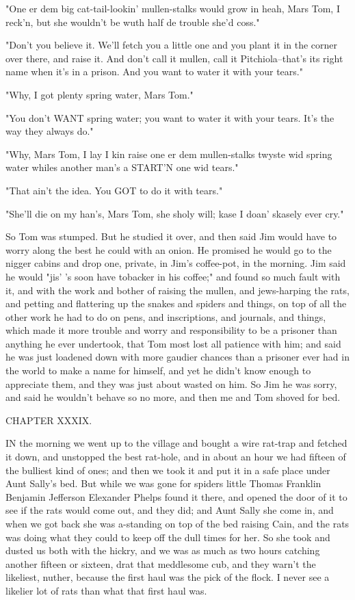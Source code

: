 "One er dem big cat-tail-lookin' mullen-stalks would grow in heah, Mars
Tom, I reck'n, but she wouldn't be wuth half de trouble she'd coss."

"Don't you believe it.  We'll fetch you a little one and you plant it in
the corner over there, and raise it.  And don't call it mullen, call it
Pitchiola--that's its right name when it's in a prison.  And you want to
water it with your tears."

"Why, I got plenty spring water, Mars Tom."

"You don't WANT spring water; you want to water it with your tears.  It's
the way they always do."

"Why, Mars Tom, I lay I kin raise one er dem mullen-stalks twyste wid
spring water whiles another man's a START'N one wid tears."

"That ain't the idea.  You GOT to do it with tears."

"She'll die on my han's, Mars Tom, she sholy will; kase I doan' skasely
ever cry."

So Tom was stumped.  But he studied it over, and then said Jim would have
to worry along the best he could with an onion.  He promised he would go
to the nigger cabins and drop one, private, in Jim's coffee-pot, in the
morning. Jim said he would "jis' 's soon have tobacker in his coffee;"
and found so much fault with it, and with the work and bother of raising
the mullen, and jews-harping the rats, and petting and flattering up the
snakes and spiders and things, on top of all the other work he had to do
on pens, and inscriptions, and journals, and things, which made it more
trouble and worry and responsibility to be a prisoner than anything he
ever undertook, that Tom most lost all patience with him; and said he was
just loadened down with more gaudier chances than a prisoner ever had in
the world to make a name for himself, and yet he didn't know enough to
appreciate them, and they was just about wasted on him.  So Jim he was
sorry, and said he wouldn't behave so no more, and then me and Tom shoved
for bed.




CHAPTER XXXIX.

IN the morning we went up to the village and bought a wire rat-trap and
fetched it down, and unstopped the best rat-hole, and in about an hour we
had fifteen of the bulliest kind of ones; and then we took it and put it
in a safe place under Aunt Sally's bed.  But while we was gone for
spiders little Thomas Franklin Benjamin Jefferson Elexander Phelps found
it there, and opened the door of it to see if the rats would come out,
and they did; and Aunt Sally she come in, and when we got back she was
a-standing on top of the bed raising Cain, and the rats was doing what
they could to keep off the dull times for her.  So she took and dusted us
both with the hickry, and we was as much as two hours catching another
fifteen or sixteen, drat that meddlesome cub, and they warn't the
likeliest, nuther, because the first haul was the pick of the flock.
I never see a likelier lot of rats than what that first haul was.

